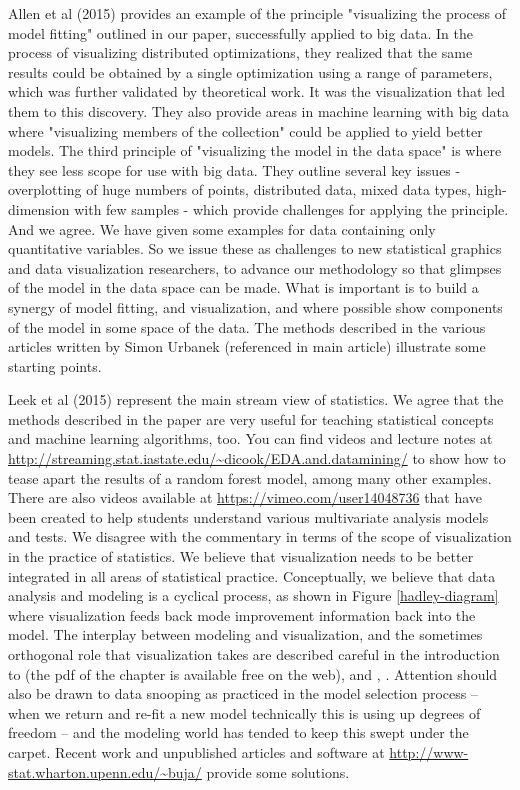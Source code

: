 \documentclass[preprint]{imsart}
\begin{document}
Allen et al (2015)  provides an example of the principle "visualizing the process of model fitting" outlined in our paper, successfully applied to big data. In the process of visualizing distributed optimizations, they realized that the same results could be obtained by a single optimization using a range of parameters, which was further validated by theoretical work. It was the visualization that led them to this discovery. They also provide areas in machine learning with big data where "visualizing members of the collection" could be applied to yield better models. The third principle of "visualizing the model in the data space" is where they see less scope for use with big data. They outline several key issues - overplotting of huge numbers of points, distributed data, mixed data types, high-dimension with few samples - which provide challenges for applying the principle. And we agree. We have given some examples for data containing only quantitative variables. So we issue these as challenges to new statistical graphics and data visualization researchers, to advance our methodology so that glimpses of the model in the data space can be made. What is important is to build a synergy of model fitting, and visualization, and where possible show components of the model in some space of the data. The methods described in the various articles written by Simon Urbanek (referenced in main article)  illustrate some starting points.

Leek et al (2015) represent the main stream view of statistics. We agree that the methods described in the paper are very useful for teaching statistical concepts and machine learning algorithms, too. You can find videos and lecture notes at \url{http://streaming.stat.iastate.edu/~dicook/EDA.and.datamining/} to show how to tease apart the results of a random forest model, among many other examples. There are also videos available at \url{https://vimeo.com/user14048736} that have been created to help students understand various multivariate analysis models and tests. We disagree with the commentary in terms of the scope of visualization in the practice of statistics. We believe that visualization needs to be better integrated in all areas of statistical practice. Conceptually, we believe that data analysis and modeling is a cyclical process, as shown in Figure \ref{hadley-diagram} where visualization feeds back mode improvement information back  into the model.  The interplay between modeling and visualization, and the sometimes orthogonal role that visualization takes are described careful in the introduction to \cite{cook:2007} (the pdf of the chapter is available free on the web), and \cite{Ch95}, \cite{CH90}. Attention should also be drawn to data snooping as practiced in the model selection process -- when we return and re-fit a new model technically this is using up degrees of freedom -- and the modeling world has tended to keep this swept under the carpet. Recent work \cite{berk:2013} and unpublished articles and software at \url{http://www-stat.wharton.upenn.edu/~buja/} provide some solutions.
\end{document}
